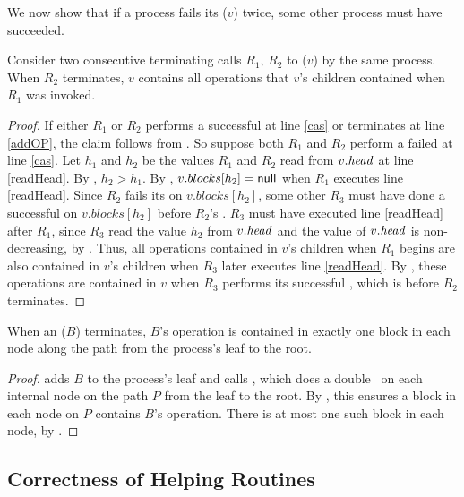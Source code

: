 We now show that if a process fails its ($v$) twice, some other process must have succeeded.

\begin{lemma}\label{lem::doubleRefresh}
Consider two consecutive terminating calls $R_1$, $R_2$ to ($v$) by the same process.
When $R_2$ terminates, $v$ contains all operations that $v$'s children contained when $R_1$ was invoked.
\end{lemma}
\begin{proof}
If either $R_1$ or $R_2$ performs a successful  at line \ref{cas} or terminates at line \ref{addOP}, the claim follows
from .
So suppose both $R_1$ and $R_2$ perform a failed  at line \ref{cas}.
Let $h_1$ and $h_2$ be the values $R_1$ and $R_2$ read from $v.\mbox{\textit{head}}$ at line \ref{readHead}.
By , $h_2>h_1$.
By , $v.blocks[h_2]=\mbox{\sf null}$ when $R_1$ executes line \ref{readHead}.
Since $R_2$ fails its  on $v.blocks[h_2]$, some other  $R_3$ must have done
a successful  on $v.blocks[h_2]$ before $R_2$'s .
$R_3$ must have executed line \ref{readHead} after $R_1$, since $R_3$ read the value $h_2$ from $v.\mbox{\textit{head}}$ and the value of $v.\mbox{\textit{head}}$ is non-decreasing, by .
Thus, all operations contained in $v$'s children when $R_1$ begins
are also contained in $v$'s children when $R_3$ later executes line \ref{readHead}.
By , these operations are contained in $v$ when $R_3$ performs its successful ,
which is before $R_2$ terminates.
\end{proof}

\begin{lemma} \label{lem::appendExactlyOnce}
When an ($B$) terminates, $B$'s operation is contained in exactly one block in each node along the path from the process's leaf to the root.
\end{lemma}
\begin{proof}
 adds $B$ to the process's leaf and calls , which
does a double ~on each internal node on the path $P$ from the leaf to the root.
By , this ensures a block in each node on $P$ contains $B$'s operation.
There is at most one such block in each node, by .
\end{proof}

\subsection{Correctness of Helping Routines}
\label{sec::helpingCorrect}

